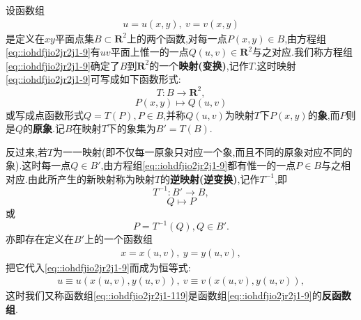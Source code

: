 \documentclass[../../main.tex]{subfiles}%
\begin{document}
\begin{definition}
设函数组
\begin{align}
u = u(x,y),\ v = v(x,y) \label{eq::iohdfjio2jr2j1-9}
\end{align}
是定义在$xy$平面点集$B \subset \mathbf{R}^2$上的两个函数,对每一点$P(x,y) \in B$,由方程组\eqref{eq::iohdfjio2jr2j1-9}有$uv$平面上惟一的一点$Q(u,v) \in \mathbf{R}^2$与之对应.我们称方程组\eqref{eq::iohdfjio2jr2j1-9}确定了$B$到$\mathbf{R}^2$的一个\textbf{映射(变换)},记作$T$.这时映射\eqref{eq::iohdfjio2jr2j1-9}可写成如下函数形式:
\[
T: B \to \mathbf{R}^2,
\]
\[
P(x,y) \mapsto Q(u,v)
\]
或写成点函数形式$Q = T(P), P \in B$,并称$Q(u,v)$为映射$T$下$P(x,y)$的\textbf{象},而$P$则是$Q$的\textbf{原象}.记$B$在映射$T$下的象集为$B' = T(B)$.

反过来,若$T$为一一映射(即不仅每一原象只对应一个象,而且不同的原象对应不同的象).这时每一点$Q \in B'$,由方程组\eqref{eq::iohdfjio2jr2j1-9}都有惟一的一点$P \in B$与之相对应.由此所产生的新映射称为映射$T$的\textbf{逆映射(逆变换)},记作$T^{-1}$,即
\[
T^{-1}: B' \to B,
\]
\[
Q \mapsto P
\]
或
\[
P = T^{-1}(Q), Q \in B'.
\]
亦即存在定义在$B'$上的一个函数组
\begin{align}
x = x(u,v),\ y = y(u,v), \label{eq::iohdfjio2jr2j1-119}
\end{align}
把它代入\eqref{eq::iohdfjio2jr2j1-9}而成为恒等式:
\begin{align}
u \equiv u(x(u,v),y(u,v)),\ v \equiv v(x(u,v),y(u,v)), \label{eq::iohdfjio2jr2j1-1129}
\end{align}
这时我们又称函数组\eqref{eq::iohdfjio2jr2j1-119}是函数组\eqref{eq::iohdfjio2jr2j1-9}的\textbf{反函数组}.
\end{definition}
\end{document}
